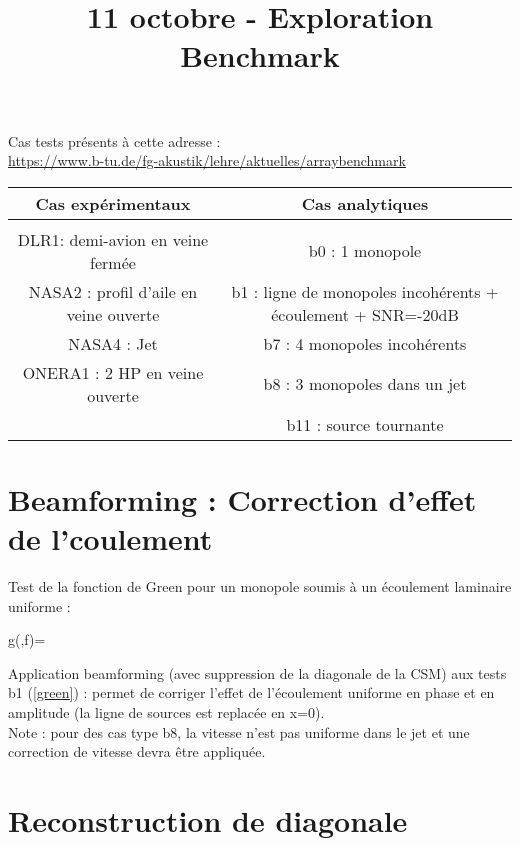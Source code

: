 \documentclass[twocolumn, 12pt, landscape]{article}
\title{\vspace{-12mm}\fontsize{14pt}{14pt}\selectfont\textbf{11 octobre - Exploration Benchmark}} %
\date{\vspace{-1cm}
}
\renewenvironment{equation}{\vspace{-0.2cm}\begin{oldequation}}{\vspace{-0.2cm}\end{oldequation}}
\begin{document}
\maketitle %

Cas tests présents à cette adresse :\\
 \url{https://www.b-tu.de/fg-akustik/lehre/aktuelles/arraybenchmark}\\



\begin{tabulary}{\columnwidth}{C|C}
Cas expérimentaux & Cas analytiques \\\hline\\
DLR1: demi-avion en veine fermée & b0 : 1 monopole \\
NASA2 : profil d'aile en veine ouverte & b1 : ligne de monopoles incohérents + écoulement + SNR=-20dB\\
NASA4 : Jet & b7 : 4 monopoles incohérents \\
ONERA1 : 2 HP en veine ouverte & b8 : 3 monopoles dans un jet \\
 ~ & b11 :  source tournante
\end{tabulary}



\section{Beamforming : Correction d'effet de l'coulement}

Test de la fonction de Green pour un monopole soumis à un écoulement laminaire uniforme : 
\begin{equation}
	g(,f)=
\end{equation}

Application beamforming (avec suppression de la diagonale de la CSM) aux tests b1 (\ref{green}) : permet de corriger l'effet de l'écoulement uniforme en phase et en amplitude (la ligne de sources est replacée en x=0).\\
Note : pour des cas type b8, la vitesse n'est pas uniforme dans le jet et une correction de vitesse devra être appliquée.



\section{Reconstruction de diagonale}
\end{document}
